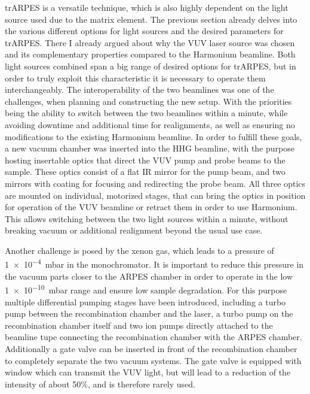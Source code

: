 trARPES is a versatile technique, which is also highly dependent on the light source used due to the matrix element.
The previous section already delves into the various different options for light sources and the desired parameters for trARPES.
There I already argued about why the VUV laser source was chosen and its complementary properties compared to the Harmonium beamline.
Both light sources combined span a big range of desired options for trARPES, but in order to truly exploit this characteristic it is necessary to operate them interchangeably. 
The interoperability of the two beamlines was one of the challenges, when planning and constructing the new setup.
With the priorities being the ability to switch between the two beamlines within a minute, while avoiding downtime and additional time for realignments, as well as ensuring no modifications to the existing Harmonium beamline.
In order to fulfill these goals, a new vacuum chamber was inserted into the HHG beamline, with the purpose hosting insertable optics that direct the VUV pump and probe beams to the sample.
These optics consist of a flat IR mirror for the pump beam, and two  mirrors with  coating for focusing and redirecting the probe beam.
All three optics are mounted on individual, motorized stages, that can bring the optics in position for operation of the VUV beamline or retract them in order to use Harmonium.
This allows switching between the two light sources within a minute, without breaking vacuum or additional realignment beyond the usual use case.

Another challenge is posed by the xenon gas, which leads to a pressure of \qty{1e-4}{\milli\bar} in the monochromator.
It is important to reduce this pressure in the vacuum parts closer to the ARPES chamber in order to operate in the low \qty{1e-10}{\milli\bar} range and ensure low sample degradation.
For this purpose multiple differential pumping stages have been introduced, including a turbo pump between the recombination chamber and the laser, a turbo pump on the recombination chamber itself and two ion pumps directly attached to the beamline tupe connecting the recombination chamber with the ARPES chamber.
Additionally a gate valve can be inserted in front of the recombination chamber to completely separate the two vacuum systems.
The gate valve is equipped with  window which can transmit the VUV light, but will lead to a reduction of the intensity of about 50\%, and is therefore rarely used.

